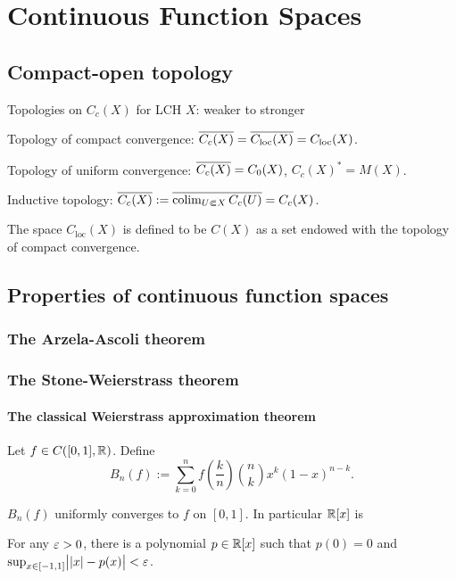 \documentclass{../note}
\begin{document}
\part{Continuous Function Spaces}
\chapter{Compact-open topology}


Topologies on $C_c(X)$ for LCH $X$: weaker to stronger
\begin{parts}
\item Topology of compact convergence: $\overline{C_c(X)}=\overline{C_{\mathrm{loc}}(X)}=C_{\mathrm{loc}}(X)$.
\item Topology of uniform convergence: $\overline{C_c(X)}=C_0(X)$, $C_c(X)^*=M(X)$.
\item Inductive topology: $\overline{C_c(X)}:=\overline{\operatorname*{colim}_{U\Subset X}C_c(U)}=C_c(X)$.
\end{parts}
The space $C_{\mathrm{loc}}(X)$ is defined to be $C(X)$ as a set endowed with the topology of compact convergence.



\chapter{Properties of continuous function spaces}

\section{The Arzela-Ascoli theorem}



















\section{The Stone-Weierstrass theorem}

\subsection{The classical Weierstrass approximation theorem}
\begin{prb}
Let $f\in C([0,1],\mathbb{R})$.
Define
\[B_n(f):=\sum_{k=0}^nf\left(\frac kn\right)\binom nkx^k(1-x)^{n-k}.\]
\begin{parts}
\item $B_n(f)$ uniformly converges to $f$ on $[0,1]$. In particular $\mathbb{R}[x]$ is 
\item For any $\varepsilon>0$, there is a polynomial $p\in\mathbb{R}[x]$ such that $p(0)=0$ and $\sup_{x\in[-1,1]}\bigl||x|-p(x)\bigr|<\varepsilon$.
\end{parts}
\end{prb}
\end{document}
